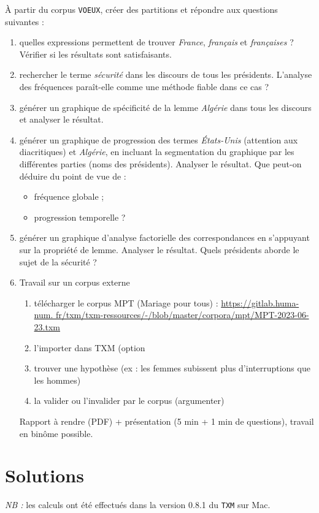 \documentclass[xcolor={table,usenames,dvipsnames}]{article}
\begin{document}
	À partir du corpus \texttt{VOEUX}, créer des partitions et répondre aux questions suivantes :
	\begin{enumerate}
		\item quelles expressions permettent de trouver \textit{France}, \textit{français} et \textit{françaises} ? Vérifier si les résultats sont satisfaisants.
		\item rechercher le terme \textit{sécurité} dans les discours de tous les présidents. L'analyse des fréquences paraît-elle comme une méthode fiable dans ce cas ?
		\item générer un graphique de spécificité de la lemme \textit{Algérie} dans tous les discours et analyser le résultat.
		\item générer un graphique de progression des termes \textit{États-Unis} (attention aux diacritiques) et \textit{Algérie}, en incluant la segmentation du graphique par les différentes parties (noms des présidents). Analyser le résultat. Que peut-on déduire du point de vue de :
		\begin{itemize}
			\item fréquence globale ;
			\item progression temporelle ?
		\end{itemize}
		\item générer un graphique d'analyse factorielle des correspondances en s'appuyant sur la propriété de lemme. Analyser le résultat. Quels présidents aborde le sujet de la sécurité ?
		\item Travail sur un corpus externe
		\begin{enumerate}
					\item télécharger le corpus \textsc{MPT} (Mariage pour tous) : \url{https://gitlab.huma-num.
				fr/txm/txm-ressources/-/blob/master/corpora/mpt/MPT-2023-06-23.txm}
			\item l'importer dans \textsc{TXM} (option 
			\item trouver une hypothèse (ex : les femmes subissent plus d’interruptions que les hommes)
			\item la valider ou l’invalider par le corpus (argumenter)
		\end{enumerate}
		Rapport à rendre (PDF) + présentation (5 min + 1 min de questions), travail en binôme possible.
	\end{enumerate}
	
	\bigskip
	
\section{Solutions}
\textit{NB :} les calculs ont été effectués dans la version \textsc{0.8.1} du \texttt{TXM} sur Mac.
\end{document}
